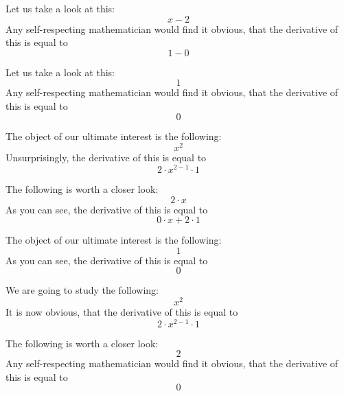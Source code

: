 \documentclass{article}
\begin{document}
Let us take a look at this:
\begin{equation}
x - 2 
\end{equation}
Any self-respecting mathematician would find it obvious, that the derivative of this is equal to
\begin{equation}
1 - 0 
\end{equation}

Let us take a look at this:
\begin{equation}
1 
\end{equation}
Any self-respecting mathematician would find it obvious, that the derivative of this is equal to
\begin{equation}
0 
\end{equation}

The object of our ultimate interest is the following:
\begin{equation}
x ^{2 } 
\end{equation}
Unsurprisingly, the derivative of this is equal to
\begin{equation}
2 \cdot x ^{2 - 1 } \cdot 1 
\end{equation}

The following is worth a closer look:
\begin{equation}
2 \cdot x 
\end{equation}
As you can see, the derivative of this is equal to
\begin{equation}
0 \cdot x + 2 \cdot 1 
\end{equation}

The object of our ultimate interest is the following:
\begin{equation}
1 
\end{equation}
As you can see, the derivative of this is equal to
\begin{equation}
0 
\end{equation}

We are going to study the following:
\begin{equation}
x ^{2 } 
\end{equation}
It is now obvious, that the derivative of this is equal to
\begin{equation}
2 \cdot x ^{2 - 1 } \cdot 1 
\end{equation}

The following is worth a closer look:
\begin{equation}
2 
\end{equation}
Any self-respecting mathematician would find it obvious, that the derivative of this is equal to
\begin{equation}
0 
\end{equation}
\end{document}
